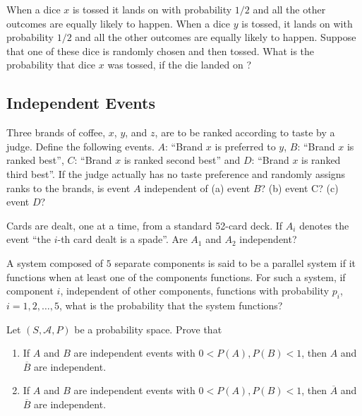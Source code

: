	\begin{problem}
	When a dice $x$ is tossed it lands on  with probability $1/2$ and all the other outcomes are equally likely to happen. When a dice $y$ is tossed, it lands on  with probability $1/2$ and all the other outcomes are equally likely to happen. Suppose that one of these dice is randomly chosen and then tossed. What is the probability that dice $x$ was tossed, if the die landed on ?
	\end{problem}
	
	\subsection{Independent Events}
	
	\begin{problem}
	Three brands of coffee, $x$, $y$, and $z$, are to be ranked according to taste by a judge. Define the following events. $A$: ``Brand $x$ is preferred to $y$, $B$: ``Brand $x$ is ranked best'', $C$: ``Brand $x$ is ranked second best'' and $D$: ``Brand $x$ is ranked third best''. If the judge actually has no taste preference and randomly assigns ranks to the brands, is event $A$ independent of (a) event $B$? (b) event C? (c) event $D$?
	\end{problem}
	
	\begin{problem}
	Cards are dealt, one at a time, from a standard 52-card deck. If $A_i$ denotes the event ``the $i$-th card dealt is a spade''. Are $A_1$ and $A_2$ independent?
	\end{problem}	

	\begin{problem}
	A system composed of $5$ separate components is said to be a parallel system if it functions when at least one of the components functions. For such a system, if component $i$, independent of other components, functions with probability $p_i$, $i = 1, 2, \ldots , 5$, what is the probability that the system functions?
	\end{problem}
	
	\begin{problem}
	Let $(S , \mathcal{A} , P )$ be a probability space. Prove that 
		\begin{enumerate}[label=\alph*)]
		\item If $A$ and $B$ are independent events with $0 < P (A), P (B) < 1$, then $A$ and $\overline{B}$ are independent.
		\item If $A$ and $B$ are independent events with $0 < P (A) , P (B) < 1$, then $\overline{A}$ and $\overline{B}$ are independent.
		\end{enumerate}
	\end{problem}


